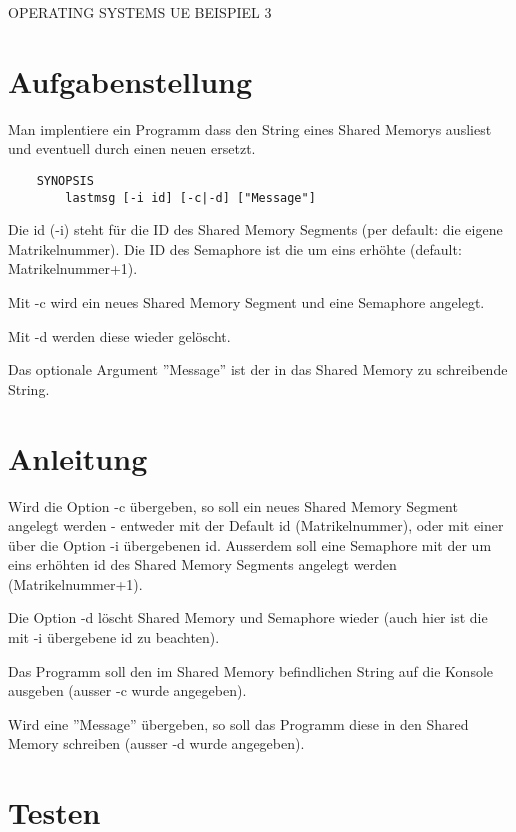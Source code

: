 \documentclass{article}
\begin{document}
\begin{center}
\begin{Large}
OPERATING SYSTEMS UE BEISPIEL 3
\end{Large}
\end{center}


\section*{Aufgabenstellung}


Man implentiere ein Programm dass den String eines Shared Memorys ausliest und
eventuell durch einen neuen ersetzt.
\begin{verbatim}
    SYNOPSIS
        lastmsg [-i id] [-c|-d] ["Message"]
\end{verbatim}

Die id (-i) steht für die ID des Shared Memory Segments (per default: die eigene Matrikelnummer).
Die ID des Semaphore ist die um eins erhöhte (default: Matrikelnummer+1).

Mit -c wird ein neues Shared Memory Segment und eine Semaphore angelegt.

Mit -d werden diese wieder gelöscht.

Das optionale Argument ''Message'' ist der in das Shared Memory zu schreibende String.

\section*{Anleitung}

Wird die Option -c übergeben, so soll ein neues Shared Memory Segment angelegt
werden - entweder mit der Default id (Matrikelnummer), oder mit einer über die Option -i
übergebenen id. Ausserdem soll eine Semaphore mit der um eins erhöhten id des
Shared Memory Segments angelegt werden (Matrikelnummer+1).

Die Option -d löscht Shared Memory und Semaphore wieder (auch hier ist die mit
-i übergebene id zu beachten).

Das Programm soll den im Shared Memory befindlichen String auf die Konsole
ausgeben (ausser -c wurde angegeben).

Wird eine ''Message'' übergeben, so soll das Programm diese in den Shared
Memory schreiben (ausser -d wurde angegeben).

\section*{Testen}
\end{document}
